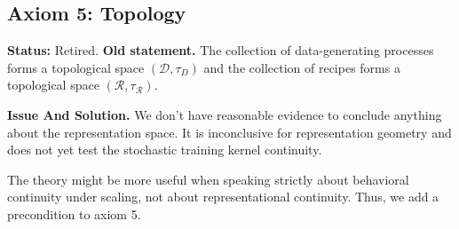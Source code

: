 \documentclass[12pt]{article}
\begin{document}
\subsection{Axiom 5: Topology}

\begin{histaxiom}[Axiom 5 - v0.0 - 2025-09-03]
\textbf{Status:} Retired.
\textbf{Old statement.}
The collection of data-generating processes forms a topological space $(\mathcal D, \tau_D)$ and the collection of recipes forms a topological space $(\mathcal R, \tau_\mathcal R)$.

\textbf{Issue And Solution.}
We don’t have reasonable evidence to conclude anything about
the representation space. It is inconclusive for representation geometry and does not yet
test the stochastic training kernel continuity. 

The theory might be more useful when speaking strictly about behavioral continuity under scaling, not about representational continuity. Thus, we add a precondition to axiom 5.
    
\end{histaxiom}
\end{document}
